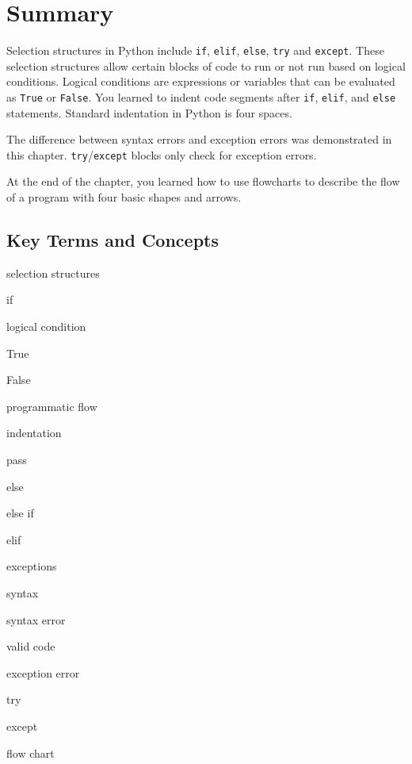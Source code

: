 \documentclass{book}
\newenvironment{key_terms}{\begin{multicols}{3}}{\end{multicols}} %
\newcommand{\passthrough}[1]{#1}
\begin{document}
    
        \newpage
        \hypertarget{summary}{%
\section{Summary}\label{summary}}

    




    
        Selection structures in Python include \passthrough{\lstinline!if!},
\passthrough{\lstinline!elif!}, \passthrough{\lstinline!else!},
\passthrough{\lstinline!try!} and \passthrough{\lstinline!except!}.
These selection structures allow certain blocks of code to run or not
run based on logical conditions. Logical conditions are expressions or
variables that can be evaluated as \passthrough{\lstinline!True!} or
\passthrough{\lstinline!False!}. You learned to indent code segments
after \passthrough{\lstinline!if!}, \passthrough{\lstinline!elif!}, and
\passthrough{\lstinline!else!} statements. Standard indentation in
Python is four spaces.

The difference between syntax errors and exception errors was
demonstrated in this chapter.
\passthrough{\lstinline!try!}/\passthrough{\lstinline!except!} blocks
only check for exception errors.

At the end of the chapter, you learned how to use flowcharts to describe
the flow of a program with four basic shapes and arrows.
    




    
        \hypertarget{key-terms-and-concepts}{%
\subsection{Key Terms and Concepts}\label{key-terms-and-concepts}}
    




    
        \begin{key_terms}
        selection structures

if

logical condition

True

False

programmatic flow

indentation

pass

else

else if

elif

exceptions

syntax

syntax error

valid code

exception error

try

except

flow chart
        \end{key_terms}
\end{document}
